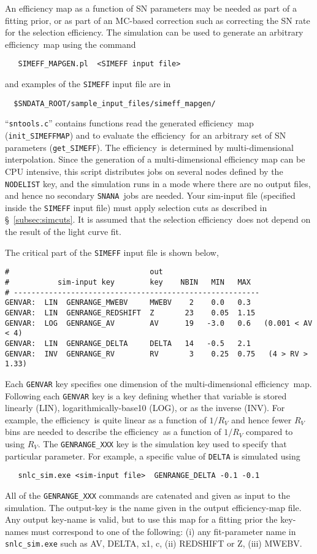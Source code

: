 \documentclass[12pt]{article}
\newcommand{\snana}{{\tt SNANA}}
\newcommand{\eff}{efficiency}
\begin{document}
An efficiency map as a function of SN parameters may be
needed as part of a fitting prior, or as part of an
MC-based correction such as correcting the SN rate
for the selection \eff.
The simulation can be used to generate an arbitrary 
\eff\ map using the command
\begin{verbatim}
   SIMEFF_MAPGEN.pl  <SIMEFF input file>
\end{verbatim}
%
and examples of the {\tt SIMEFF} input file are in
\begin{verbatim}
  $SNDATA_ROOT/sample_input_files/simeff_mapgen/
\end{verbatim}
``{\tt sntools.c}'' contains functions read the generated 
\eff\ map  ({\tt init\_SIMEFFMAP}) and to evaluate the \eff\
for an arbitrary set of SN parameters ({\tt get\_SIMEFF}).
The \eff\ is determined by multi-dimensional interpolation.
%
Since the generation of a multi-dimensional efficiency map 
can be CPU intensive, this script distributes jobs on several 
nodes defined by the {\tt NODELIST} key, and the simulation 
runs in a mode where there are no output files, 
and hence no secondary \snana\ jobs are needed.
Your sim-input file (specified inside the {\tt SIMEFF} input file) 
must apply selection cuts as described in \S~\ref{subsec:simcuts}.
It is assumed that the selection \eff\ does not depend on
the result of the light curve fit.


The critical part of the {\tt SIMEFF} input file
is shown below,
\begin{Verbatim}[frame=single]
#                                out
#           sim-input key        key    NBIN   MIN   MAX
# --------------------------------------------------------
GENVAR:  LIN  GENRANGE_MWEBV     MWEBV    2    0.0   0.3
GENVAR:  LIN  GENRANGE_REDSHIFT  Z       23    0.05  1.15
GENVAR:  LOG  GENRANGE_AV        AV      19   -3.0   0.6   (0.001 < AV < 4)
GENVAR:  LIN  GENRANGE_DELTA     DELTA   14   -0.5   2.1
GENVAR:  INV  GENRANGE_RV        RV       3    0.25  0.75   (4 > RV > 1.33)
\end{Verbatim}
%
Each {\tt GENVAR} key specifies one dimension of the
multi-dimensional \eff\ map.
Following each {\tt GENVAR} key is a key defining whether
that variable is stored linearly (LIN), 
logarithmically-base10 (LOG), or as the inverse (INV).
For example, the \eff\ is quite linear as a function
of $1/R_V$ and hence fewer $R_V$ bins are needed to 
describe the \eff\ as a function of $1/R_V$ compared to 
using $R_V$.  The {\tt GENRANGE\_XXX} key is the simulation 
key used to specify that particular parameter. For example,
a specific value of {\tt DELTA} is simulated using
\begin{verbatim}
   snlc_sim.exe <sim-input file>  GENRANGE_DELTA -0.1 -0.1
\end{verbatim} 
%
All of the {\tt GENRANGE\_XXX} commands are catenated and
given as input to the simulation. The output-key is the 
name given in the output {\eff}-map file. Any output key-name
is valid, but to use this map for a fitting prior the
key-names must correspond to one of the following:
(i) any fit-parameter name in {\tt snlc\_sim.exe} such as
AV, DELTA, x1, c,
(ii) REDSHIFT or Z,
(iii) MWEBV.
\end{document}
